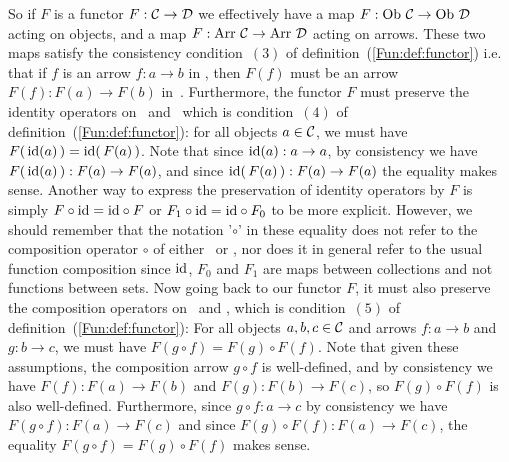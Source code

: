 So if $F$ is a functor $F:\mbox{$\cal C$}\to\mbox{$\cal D$}$ we effectively have a map 
$F:\ob\ \Cat\to\ob\ \Dat$ acting on objects, and a map 
$F:\mbox{\rm Arr}\ \mbox{$\cal C$}\to\mbox{\rm Arr}\ \mbox{$\cal D$}$ acting on arrows. These two maps 
satisfy the consistency condition~$(3)$ of definition~(\ref{Fun:def:functor})
i.e. that if $f$ is an arrow $f:a\to b$ in \Cat, then $F(f)$ must be 
an arrow $F(f):F(a)\to F(b)$ in~\Dat. Furthermore, the functor
$F$ must preserve the identity operators on \Cat\ and \Dat\ which
is condition~$(4)$ of definition~(\ref{Fun:def:functor}): for all objects
$a\in\mbox{$\cal C$}$, we must have $F(\,\mbox{\rm id}(a)\,)=\mbox{\rm id}(\,F(a)\,)$. Note that since
$\mbox{\rm id}(a):a\to a$, by consistency we have $F(\,\mbox{\rm id}(a)\,):F(a)\to F(a)$,
and since $\mbox{\rm id}(\,F(a)\,):F(a)\to F(a)$ the equality makes sense.
Another way to express the preservation of identity operators by $F$
is simply $F\circ\mbox{\rm id}=\mbox{\rm id}\circ F$ or $F_{1}\circ\mbox{\rm id}=\mbox{\rm id}\circ F_{0}$ to 
be more explicit. However, we should remember that the notation '$\circ$'
in these equality does not refer to the composition operator $\circ$
of either \Cat\ or \Dat, nor does it in general refer to the usual
function composition since $\mbox{\rm id}$, $F_{0}$ and $F_{1}$ are maps between 
collections and not functions between sets. Now going back to our
functor $F$, it must also preserve the composition operators on
\Cat\ and \Dat, which is condition~$(5)$ of definition~(\ref{Fun:def:functor}):
For all objects $a,b,c\in\mbox{$\cal C$}$ and arrows $f:a\to b$ and $g:b\to c$, 
we must have $F(g\circ f)=F(g)\circ F(f)$. Note that given these 
assumptions, the composition arrow $g\circ f$ is well-defined,
and by consistency we have $F(f):F(a)\to F(b)$ and $F(g):F(b)\to F(c)$,
so $F(g)\circ F(f)$ is also well-defined. Furthermore, since
$g\circ f:a \to c$ by consistency we have $F(g\circ f):F(a)\to F(c)$
and since $F(g)\circ F(f):F(a)\to F(c)$, the equality 
$F(g\circ f)=F(g)\circ F(f)$ makes sense.
